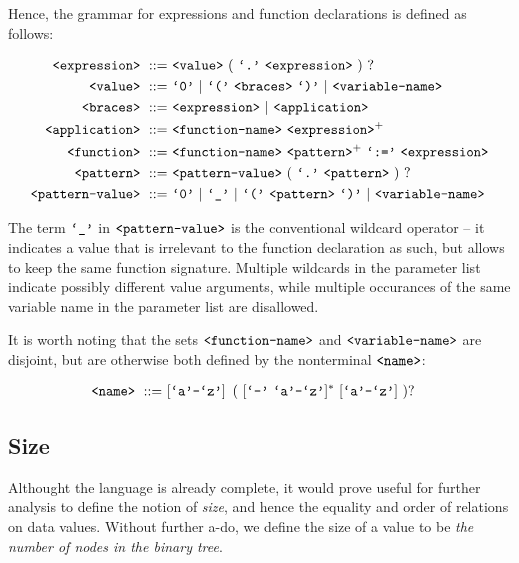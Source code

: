 Hence, the grammar for expressions and function declarations is defined as
follows:

\begin{align}
\nonterm{expression}\ ::=&\ \nonterm{value}\ (\ \term{.}\ \nonterm{expression}
\ )\ ?\\
\nonterm{value}\ ::=&\ \term{0}\ |\ \term{(}\ \nonterm{braces}\ \term{)}\ |
\ \nonterm{variable-name}\\
\nonterm{braces}\ ::=&\ \nonterm{expression}\ |
\ \nonterm{application}\\
\nonterm{application}\ ::=&\ \nonterm{function-name}
\ \nonterm{expression}^+\\
\nonterm{function}\ ::=&\ \nonterm{function-name}\ \nonterm{pattern}^+
\ \term{:=}\ \nonterm{expression}\\
\nonterm{pattern}\ ::=&\ \nonterm{pattern-value}\ (\ \term{.}
\ \nonterm{pattern}\ )\ ?\\
\nonterm{pattern-value}\ ::=&\ \term{0}\ |\ \term{\_}\ |\ \term{(}
\ \nonterm{pattern}\ \term{)}\ |\ \nonterm{variable-name}
\end{align}

The term $\text{{\ttfamily`\_'}}$ in $\text{{\ttfamily<pattern-value>}}$ is the conventional wildcard
operator -- it indicates a value that is irrelevant to the function declaration
as such, but allows to keep the same function signature. Multiple wildcards in
the parameter list indicate possibly different value arguments, while multiple
occurances of the same variable name in the parameter list are disallowed.

It is worth noting that the sets $\text{{\ttfamily<function-name>}}$ and
$\text{{\ttfamily<variable-name>}}$ are disjoint, but are otherwise both defined by the
nonterminal $\text{{\ttfamily<name>}}$:

\begin{align}
\text{{\ttfamily<name>}}\ ::=&\ [\text{{\ttfamily`a'}}\text{{\ttfamily-}}\text{{\ttfamily`z'}}]
\ \left (\ [\text{{\ttfamily`-'}}\ \text{{\ttfamily`a'}}\text{{\ttfamily-}}\text{{\ttfamily`z'}}]^*
\ [\text{{\ttfamily`a'}}\text{{\ttfamily-}}\text{{\ttfamily`z'}}]\ \right )?
\end{align}

\subsection{Size}

Althought the language is already complete, it would prove useful for further
analysis to define the notion of \emph{size}, and hence the equality and order
of relations on data values. Without further a-do, we define the size of a
value to be \emph{the number of nodes in the binary tree}.

